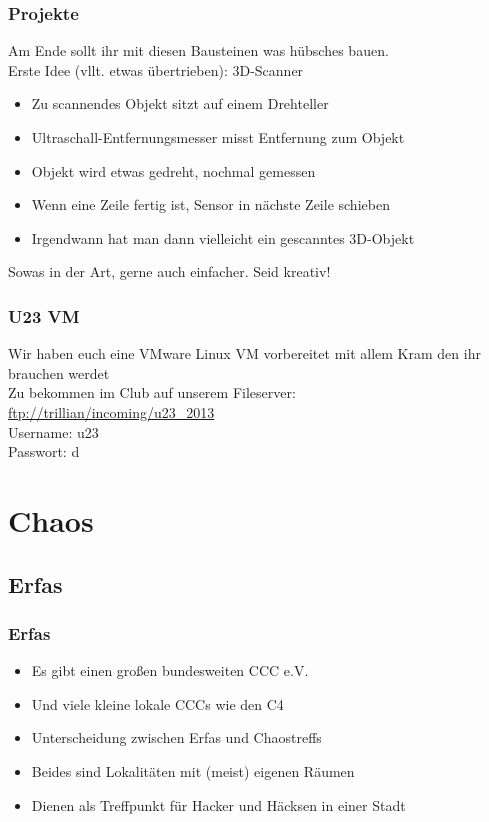 \documentclass[ngerman,compress]{beamer}
\begin{document}
\begin{frame}
	\frametitle{Projekte}
	Am Ende sollt ihr mit diesen Bausteinen was hübsches bauen. \\
	Erste Idee (vllt. etwas übertrieben): 3D-Scanner
	\begin{itemize}
		\item Zu scannendes Objekt sitzt auf einem Drehteller
		\item Ultraschall-Entfernungsmesser misst Entfernung zum Objekt
		\item Objekt wird etwas gedreht, nochmal gemessen
		\item Wenn eine Zeile fertig ist, Sensor in nächste Zeile schieben
		\item Irgendwann hat man dann vielleicht ein gescanntes 3D-Objekt
	\end{itemize}
	Sowas in der Art, gerne auch einfacher. Seid kreativ!
\end{frame}

\begin{frame}
	\frametitle{U23 VM}
	Wir haben euch eine VMware Linux VM vorbereitet mit allem Kram den ihr brauchen werdet \\
	Zu bekommen im Club auf unserem Fileserver: \\
	\url{ftp://trillian/incoming/u23_2013}
	\\
	Username: u23 \\
	Passwort: d
\end{frame}


\section{Chaos}

\subsection{Erfas}

\begin{frame}
	\frametitle{Erfas}
	\begin{itemize}
		\item Es gibt einen großen bundesweiten CCC e.V.
		\item Und viele kleine lokale CCCs wie den C4
		\item Unterscheidung zwischen Erfas und Chaostreffs
		\item Beides sind Lokalitäten mit (meist) eigenen Räumen
		\item Dienen als Treffpunkt für Hacker und Häcksen in einer Stadt
	\end{itemize}
\end{frame}
\end{document}
